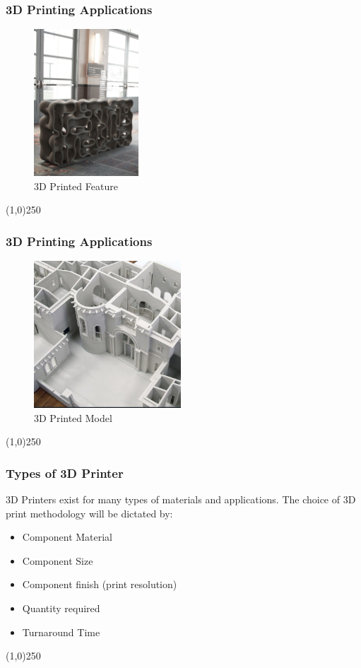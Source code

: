 \begin{frame}
\frametitle{3D Printing Applications}
\begin{figure}[h]
	\centering
	\includegraphics[height=5.5cm]{img/3DPrinting/3dprintFeature.jpg}
	\caption[3D Printed Feature]{3D Printed Feature}
	\label{fig:3dprintFeature}
\end{figure}
\end{frame}
\begin{center}\line(1,0){250}\end{center}


\begin{frame}
\frametitle{3D Printing Applications}
\begin{figure}[h]
	\centering
	\includegraphics[height=5.5cm]{img/3DPrinting/3dprintModel.jpg}
	\caption[3D Printed Model]{3D Printed Model}
	\label{fig:3dprintModel}
\end{figure}
\end{frame}
\begin{center}\line(1,0){250}\end{center}




\begin{frame}
\frametitle{Types of 3D Printer}
3D Printers exist for many types of materials and applications.  The choice of 3D print methodology will be dictated by:
\begin{itemize}
	\item Component Material
	\item Component Size
	\item Component finish (print resolution)
	\item Quantity required
	\item Turnaround Time
\end{itemize}

\end{frame}
\begin{center}\line(1,0){250}\end{center}

